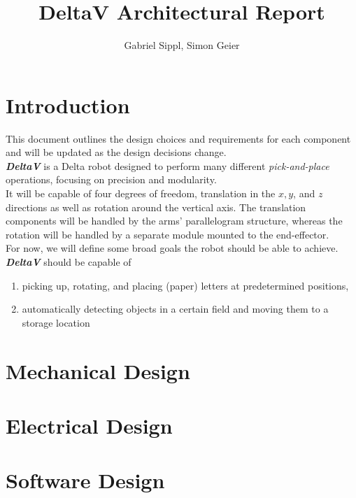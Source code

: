 \documentclass{report}
\title{DeltaV Architectural Report}
\author{Gabriel Sippl, Simon Geier}
\date{}
\begin{document}
\maketitle
\tableofcontents

\chapter{Introduction}
This document outlines the design choices and requirements for each component and will be updated as the design decisions change. \\
\textit{\textbf{DeltaV}} is a Delta robot designed to perform many different \textit{pick-and-place} operations, focusing on precision and modularity. \\
It will be capable of four degrees of freedom, translation in the $x,y$, and $z$ directions as well as rotation around the vertical axis.
The translation components will be handled by the arms' parallelogram structure, whereas the rotation will be handled by a separate module mounted to the end-effector. \\
For now, we will define some broad goals the robot should be able to achieve. \textit{\textbf{DeltaV}} should be capable of
\begin{enumerate}
  \item picking up, rotating, and placing (paper) letters at predetermined positions,
  \item automatically detecting objects in a certain field and moving them to a storage location
\end{enumerate}


\chapter{Mechanical Design}


\chapter{Electrical Design}


\chapter{Software Design}
\end{document}
